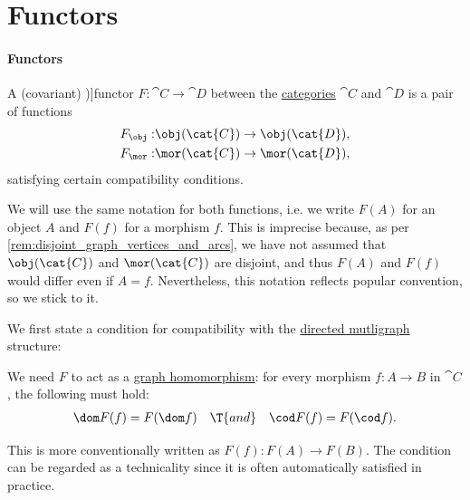 \section{Functors}\label{sec:functors}

\paragraph{Functors}

\begin{definition}\label{def:functor}
  A (covariant) \term[ru=функтор (\cite[def. III.1.1]{ЦаленкоШульгейфер1974ОсновыТеорииКатегорий})]{functor} \( F: \cat{C} \to \cat{D} \) between the \hyperref[def:category]{categories} \( \cat{C} \) and \( \cat{D} \) is a pair of functions
  \begin{equation*}
    \begin{aligned}
      F_{\obj}: &\obj(\cat{C}) \to \obj(\cat{D}), \\
      F_{\mor}: &\mor(\cat{C}) \to \mor(\cat{D}),
    \end{aligned}
  \end{equation*}
  satisfying certain compatibility conditions.

  We will use the same notation for both functions, i.e. we write \( F(A) \) for an object \( A \) and \( F(f) \) for a morphism \( f \). This is imprecise because, as per \cref{rem:disjoint_graph_vertices_and_arcs}, we have not assumed that \( \obj(\cat{C}) \) and \( \mor(\cat{C}) \) are disjoint, and thus \( F(A) \) and \( F(f) \) would differ even if \( A = f \). Nevertheless, this notation reflects popular convention, so we stick to it.

  We first state a condition for compatibility with the \hyperref[def:directed_multigraph]{directed mutligraph} structure:
  \begin{thmenum}[series=def:functor]
     We need \( F \) to act as a \hyperref[def:directed_multigraph/morphism]{graph homomorphism}: for every morphism \( f: A \to B \) in \( \cat{C} \), the following must hold:
    \begin{align*}
      \dom F(f) = F(\dom f) && \T{and} && \cod F(f) = F(\cod f).
    \end{align*}

    This is more conventionally written as \( F(f): F(A) \to F(B) \). The condition can be regarded as a technicality since it is often automatically satisfied in practice.
  \end{thmenum}


\end{definition}
